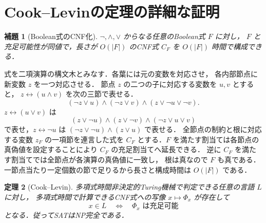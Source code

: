 \documentclass[a5paper,10pt,onecolumn]{jsarticle}
\makeatletter
\theoremstyle{mathnotetheorem}
\newtheorem{theorem}{定理}[section]
\newtheorem{lemma}[theorem]{補題}
\renewcommand{\proofname}{証明}
\renewenvironment{proof}[1][\proofname]{%
  \par\pushQED{\qed}\normalfont\topsep4\p@\@plus2\p@\relax
  \trivlist\item[\hskip\labelsep\bfseries #1]\ignorespaces
}{\popQED\endtrivlist\@endpefalse}
\makeatother
\begin{document}
\section{Cook--Levinの定理の詳細な証明}
\begin{lemma}[Boolean式のCNF化]
$\neg,\wedge,\vee$ からなる任意のBoolean式 $F$ に対し，
$F$ と充足可能性が同値で，長さが $O(|F|)$ のCNF式 $C_F$ を
$O(|F|)$ 時間で構成できる．
\end{lemma}
\begin{proof}
式を二項演算の構文木とみなす．各葉には元の変数を対応させ，
各内部節点に新変数 $z$ を一つ対応させる．
節点 $z$ の二つの子に対応する変数を $u,v$ とすると，
$z\leftrightarrow(u\wedge v)$ を次の三節で表せる．
\[
 (\neg z\vee u)\wedge(\neg z\vee v)
 \wedge(z\vee\neg u\vee\neg v).
\]
$z\leftrightarrow(u\vee v)$ は
\[
 (z\vee\neg u)\wedge(z\vee\neg v)
 \wedge(\neg z\vee u\vee v)
\]
で表せ，$z\leftrightarrow\neg u$ は
$(\neg z\vee\neg u)\wedge(z\vee u)$ で表せる．
全節点の制約と根に対応する変数 $z_F$ の一項節を連言した式を
$C_F$ とする．$F$ を満たす割当ては各節点の真偽値を設定することにより
$C_F$ の充足割当てへ延長できる．
逆に $C_F$ を満たす割当てでは全節点が各演算の真偽値に一致し，
根は真なので $F$ も真である．
一節点当たり一定個数の節で足りるから長さと構成時間は $O(|F|)$ である．
\end{proof}
\begin{theorem}[Cook--Levin]
多項式時間非決定的Turing機械で判定できる任意の言語 $L$ に対し，
多項式時間で計算できるCNF式への写像
$x\mapsto\Phi_x$ が存在して
\[
 x\in L\quad\Longleftrightarrow\quad\Phi_x\text{ は充足可能}
\]
となる．従ってSATはNP完全である．
\end{theorem}
\end{document}

